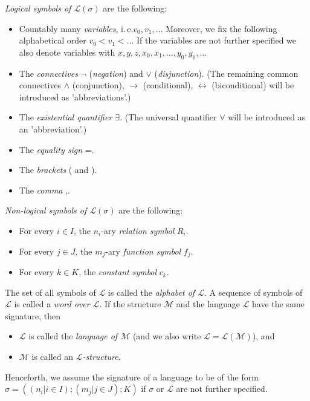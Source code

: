 \textit{Logical symbols of $\mathcal{L}(\sigma)$} are the following:
\begin{itemize}
\item Countably many \textit{variables}, i.\,e.\@ $v_0, v_1, \ldots$  Moreover, we fix the following alphabetical order $v_0 <v_1 < \ldots$
If the variables are not further specified we also denote variables with $x, y, z, x_0, x_1, \ldots, y_0, y_1, \ldots$
\item The \textit{connectives} $\lnot$ (\textit{negation}) and $\vee$ (\textit{disjunction}). (The remaining common connectives $\wedge$ (conjunction), $\rightarrow$ (conditional), $\leftrightarrow$ (biconditional) will be introduced as 'abbreviations'.)
\item The \textit{existential quantifier $\exists$}. (The universal quantifier $\forall$ will be introduced as an 'abbreviation'.)
\item The \textit{equality sign} =.
\item The \textit{brackets} ( and ).
\item The \textit{comma} ,.
\end{itemize}

\textit{Non-logical symbols of $\mathcal{L}(\sigma)$} are the following:
\begin{itemize}
\item For every $i \in I$, the $n_i$-ary \textit{relation symbol} $R_i$.
\item For every $j \in J$, the $m_j$-ary \textit{function symbol} $f_j$.
\item For every $k \in K$, the \textit{constant symbol} $c_k$.
\end{itemize}


The set of all symbols of $\mathcal{L}$ is called the \textit{alphabet of $\mathcal{L}$}. A sequence of symbols of $\mathcal{L}$ is called a \textit{word over $\mathcal{L}$}. If the structure $\mathcal{M}$ and the language $\mathcal{L}$ have the same signature, then 
\begin{itemize}
\item $\mathcal{L}$ is called the \textit{language of $\mathcal{M}$} (and we also write $\mathcal{L}=\mathcal{L}(\mathcal{M})$), and
\item $\mathcal{M}$ is called an \textit{$\mathcal{L}$-structure}.
\end{itemize}

Henceforth, we assume the signature of a language to be of the form $\sigma = ((n_i | i \in I); (m_j|j\in J); K)$ if $\sigma$ or $\mathcal{L}$ are not further specified. 

